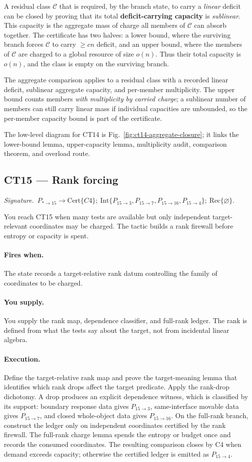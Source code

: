 \documentclass[
  11pt,
]{article}
\theoremstyle{definition}
\newcommand{\ctsignature}[1]{\par\noindent\emph{Signature.}\ #1\par\medskip}
\newcommand{\ctcert}[1]{\mathrm{Cert}\{#1\}}
\newcommand{\ctint}[1]{\mathrm{Int}\{#1\}}
\newcommand{\ctrec}[1]{\mathrm{Rec}\{#1\}}
\newcommand{\ctnone}{\varnothing}
\newcommand{\ctpar}[1]{\paragraph{#1.}}
\begin{document}
A residual class \(\mathcal C\) that is required, by the branch state,
to carry a \emph{linear} deficit can be closed by proving that its total
\textbf{deficit-carrying capacity} is \emph{sublinear}. This capacity is
the aggregate mass of charge all members of \(\mathcal C\) can absorb
together. The certificate has two halves: a lower bound, where the
surviving branch forces \(\mathcal C\) to carry \(\ge cn\) deficit, and
an upper bound, where the members of \(\mathcal C\) are charged to a
global resource of size \(o(n)\). Thus their total capacity is \(o(n)\),
and the class is empty on the surviving branch.

The aggregate comparison applies to a residual class with a recorded
linear deficit, sublinear aggregate capacity, and per-member
multiplicity.  The upper bound counts members \emph{with multiplicity by
carried charge}; a sublinear number of members can still carry linear
mass if individual capacities are unbounded, so the per-member capacity
bound is part of the certificate.

The low-level diagram for CT14 is Fig.~\ref{fig:ct14-aggregate-closure};
it links the lower-bound lemma, upper-capacity lemma, multiplicity audit,
comparison theorem, and overload route.



\subsection{CT15 --- Rank forcing}\label{ct:15}\label{rank-forcing-charge-only-independent-coordinates}
\ctsignature{\(P_{\ast\to15}\to \ctcert{C4};\ \ctint{P_{15\to3},P_{15\to7},P_{15\to16},P_{15\to4}};\ \ctrec{\ctnone}\).}

You reach CT15 when many tests are available but only independent
target-relevant coordinates may be charged.  The tactic builds a rank
firewall before entropy or capacity is spent.

\ctpar{Fires when}
The state records a target-relative rank datum controlling the family of
coordinates to be charged.

\ctpar{You supply}
You supply the rank map, dependence classifier, and full-rank ledger.
The rank is defined from what the tests say about the target, not from
incidental linear algebra.

\ctpar{Execution}
Define the target-relative rank map and prove the target-meaning lemma
that identifies which rank drops affect the target predicate.  Apply the
rank-drop dichotomy.  A drop produces an explicit dependence witness,
which is classified by its support: boundary response data gives
\(P_{15\to3}\), same-interface movable data gives \(P_{15\to7}\), and
closed whole-object data gives \(P_{15\to16}\).  On the full-rank
branch, construct the ledger only on independent coordinates certified
by the rank firewall.  The full-rank charge lemma spends the entropy or
budget once and records the consumed coordinates.  The resulting
comparison closes by C4 when demand exceeds capacity; otherwise the
certified ledger is emitted as \(P_{15\to4}\).
\end{document}
